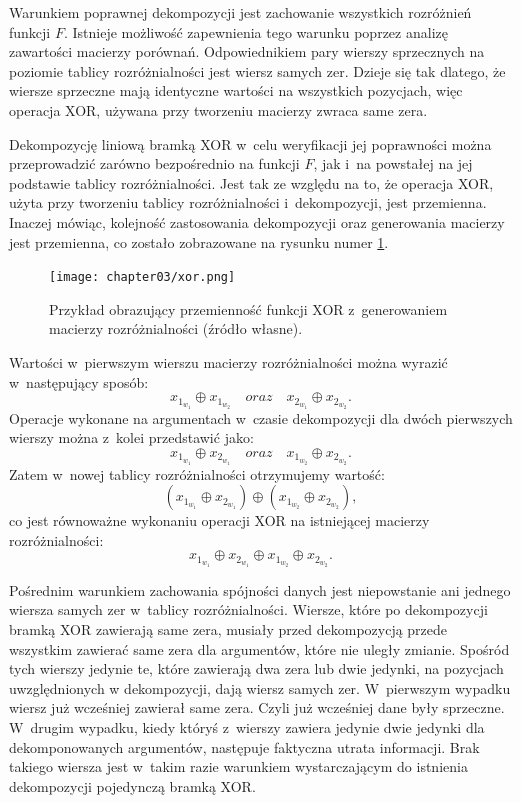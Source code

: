 Warunkiem poprawnej dekompozycji jest zachowanie wszystkich rozróżnień funkcji $F$.
Istnieje możliwość zapewnienia tego warunku poprzez analizę zawartości macierzy porównań.
Odpowiednikiem pary wierszy sprzecznych na poziomie tablicy rozróżnialności jest wiersz samych zer.
Dzieje się tak dlatego,
że wiersze sprzeczne mają identyczne wartości na wszystkich pozycjach,
więc operacja XOR,
używana przy tworzeniu macierzy zwraca same zera.

Dekompozycję liniową bramką XOR w~celu weryfikacji jej poprawności można przeprowadzić zarówno bezpośrednio na funkcji $F$,
jak i~na powstałej na jej podstawie tablicy rozróżnialności.
Jest tak ze względu na to,
że operacja XOR,
użyta przy tworzeniu tablicy rozróżnialności i~dekompozycji,
jest przemienna.
Inaczej mówiąc,
kolejność zastosowania dekompozycji oraz generowania macierzy jest przemienna,
co zostało zobrazowane na rysunku numer \ref{fig:xor}.

\begin{figure}[H]
\centering
\texttt{[image: chapter03/xor.png]}
\caption{Przykład obrazujący przemienność funkcji XOR z~generowaniem macierzy rozróżnialności (źródło własne).}
\label{fig:xor}
\end{figure}

Wartości w~pierwszym wierszu macierzy rozróżnialności można wyrazić w~następujący sposób:
\begin{equation}
x_{1_{w_1}} \oplus x_{1_{w_2}} \quad oraz \quad x_{2_{w_1}} \oplus x_{2_{w_2}}.
\end{equation}
Operacje wykonane na argumentach w~czasie dekompozycji dla dwóch pierwszych wierszy można z~kolei przedstawić jako:
\begin{equation}
x_{1_{w_1}} \oplus x_{2_{w_1}} \quad oraz \quad x_{1_{w_2}} \oplus x_{2_{w_2}}.
\end{equation}
Zatem w~nowej tablicy rozróżnialności otrzymujemy wartość:
\begin{equation}
(x_{1_{w_1}} \oplus x_{2_{w_1}}) \oplus (x_{1_{w_2}} \oplus x_{2_{w_2}}),
\end{equation}
 co jest równoważne wykonaniu operacji XOR na istniejącej macierzy rozróżnialności:
\begin{equation}
x_{1_{w_1}} \oplus x_{2_{w_1}} \oplus x_{1_{w_2}} \oplus x_{2_{w_2}}.
\end{equation}

Pośrednim warunkiem zachowania spójności danych jest niepowstanie ani jednego wiersza samych zer w~tablicy rozróżnialności.
Wiersze,
które po dekompozycji bramką XOR zawierają same zera,
musiały przed dekompozycją przede wszystkim zawierać same zera dla argumentów,
które nie uległy zmianie.
Spośród tych wierszy jedynie te,
które zawierają dwa zera lub dwie jedynki,
na pozycjach uwzględnionych w dekompozycji,
dają wiersz samych zer.
W~pierwszym wypadku wiersz już wcześniej zawierał same zera.
Czyli już wcześniej dane były sprzeczne.
W~drugim wypadku,
kiedy któryś z~wierszy zawiera jedynie dwie jedynki dla dekomponowanych argumentów,
następuje faktyczna utrata informacji.
Brak takiego wiersza jest w~takim razie warunkiem wystarczającym do istnienia dekompozycji pojedynczą bramką XOR.

